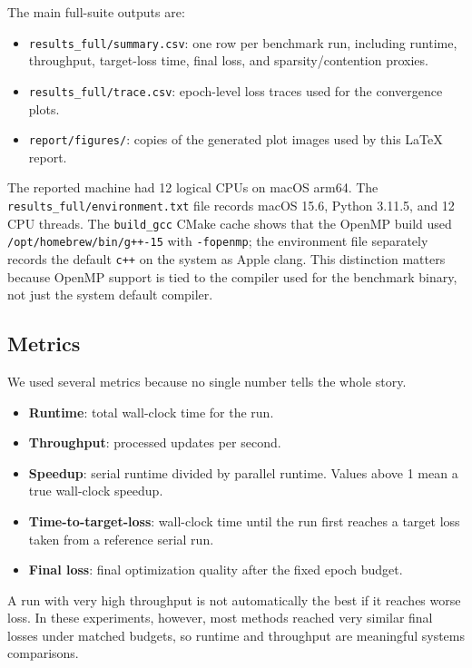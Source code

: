 \documentclass[11pt]{article}
\begin{document}
The main full-suite outputs are:

\begin{itemize}
  \item \texttt{results\_full/summary.csv}: one row per benchmark run, including runtime, throughput, target-loss time, final loss, and sparsity/contention proxies.
  \item \texttt{results\_full/trace.csv}: epoch-level loss traces used for the convergence plots.
  \item \texttt{report/figures/}: copies of the generated plot images used by this LaTeX report.
\end{itemize}

The reported machine had 12 logical CPUs on macOS arm64. The \texttt{results\_full/environment.txt} file records macOS 15.6, Python 3.11.5, and 12 CPU threads. The \texttt{build\_gcc} CMake cache shows that the OpenMP build used \texttt{/opt/homebrew/bin/g++-15} with \texttt{-fopenmp}; the environment file separately records the default \texttt{c++} on the system as Apple clang. This distinction matters because OpenMP support is tied to the compiler used for the benchmark binary, not just the system default compiler.

\subsection{Metrics}

We used several metrics because no single number tells the whole story.

\begin{itemize}
  \item \textbf{Runtime}: total wall-clock time for the run.
  \item \textbf{Throughput}: processed updates per second.
  \item \textbf{Speedup}: serial runtime divided by parallel runtime. Values above 1 mean a true wall-clock speedup.
  \item \textbf{Time-to-target-loss}: wall-clock time until the run first reaches a target loss taken from a reference serial run.
  \item \textbf{Final loss}: final optimization quality after the fixed epoch budget.
\end{itemize}

A run with very high throughput is not automatically the best if it reaches worse loss. In these experiments, however, most methods reached very similar final losses under matched budgets, so runtime and throughput are meaningful systems comparisons.
\end{document}
